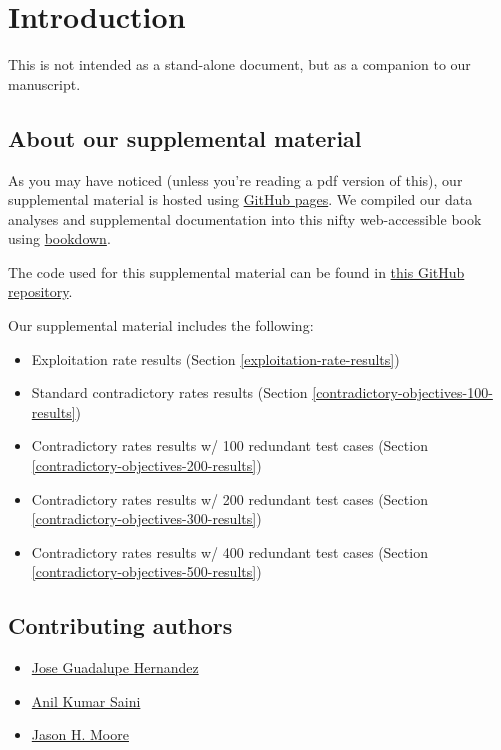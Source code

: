 \documentclass[
]{book}
\providecommand{\tightlist}{%
  \setlength{\itemsep}{0pt}\setlength{\parskip}{0pt}}
\begin{document}
\hypertarget{introduction}{%
\chapter{Introduction}\label{introduction}}

This is not intended as a stand-alone document, but as a companion to our manuscript.

\hypertarget{about-our-supplemental-material}{%
\section{About our supplemental material}\label{about-our-supplemental-material}}

As you may have noticed (unless you're reading a pdf version of this), our supplemental material is hosted using \href{https://pages.github.com/}{GitHub pages}.
We compiled our data analyses and supplemental documentation into this nifty web-accessible book using \href{https://bookdown.org}{bookdown}.

The code used for this supplemental material can be found in \href{https://github.com/jgh9094/GPTP-2024-Lexicase-Analysis}{this GitHub repository}.

Our supplemental material includes the following:

\begin{itemize}
\tightlist
\item
  Exploitation rate results (Section \ref{exploitation-rate-results})
\item
  Standard contradictory rates results (Section \ref{contradictory-objectives-100-results})
\item
  Contradictory rates results w/ 100 redundant test cases (Section \ref{contradictory-objectives-200-results})
\item
  Contradictory rates results w/ 200 redundant test cases (Section \ref{contradictory-objectives-300-results})
\item
  Contradictory rates results w/ 400 redundant test cases (Section \ref{contradictory-objectives-500-results})
\end{itemize}

\hypertarget{contributing-authors}{%
\section{Contributing authors}\label{contributing-authors}}

\begin{itemize}
\tightlist
\item
  \href{https://jgh9094.github.io/}{Jose Guadalupe Hernandez}
\item
  \href{https://theaksaini.github.io/}{Anil Kumar Saini}
\item
  \href{https://jasonhmoore.org/}{Jason H. Moore}
\end{itemize}
\end{document}
